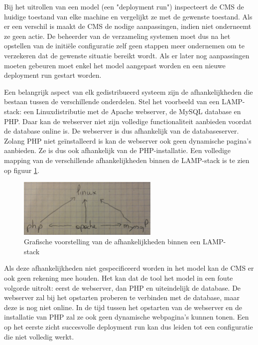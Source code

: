 Bij het uitrollen van een model (een "deployment run") inspecteert de CMS de huidige toestand van elke machine en vergelijkt ze met de gewenste toestand.
Als er een verschil is maakt de CMS de nodige aanpassingen, indien niet onderneemt ze geen actie.
De beheerder van de verzameling systemen moet dus na het opstellen van de initi\"ele configuratie zelf geen stappen meer ondernemen om te verzekeren dat de gewenste situatie bereikt wordt.
Als er later nog aanpassingen moeten gebeuren moet enkel het model aangepast worden en een nieuwe deployment run gestart worden.

Een belangrijk aspect van elk gedistribueerd systeem zijn de afhankelijkheden die bestaan tussen de verschillende onderdelen.
Stel het voorbeeld van een LAMP-stack: een Linuxdistributie met de Apache webserver, de MySQL database en PHP.
Daar kan de webserver niet zijn volledige functionaliteit aanbieden voordat de database online is.
De webserver is dus afhankelijk van de databaseserver.
Zolang PHP niet ge\"installeerd is kan de webserver ook geen dynamische pagina's aanbieden.
Ze is dus ook afhankelijk van de PHP-installatie.
Een volledige mapping van de verschillende afhankelijkheden binnen de LAMP-stack is te zien op figuur \ref{fig:lamp_dep}.
\begin{figure}
    \begin{center}
    \includegraphics[width=0.6\textwidth]{images/lamp_dep.png}
    \caption{Grafische voorstelling van de afhankelijkheden binnen een LAMP-stack}
    \label{fig:lamp_dep}
    \end{center}
\end{figure}

Als deze afhankelijkheden niet gespecificeerd worden in het model kan de CMS er ook geen rekening mee houden.
Het kan dat de tool het model in een foute volgorde uitrolt: eerst de webserver, dan PHP en uiteindelijk de database.
De webserver zal bij het opstarten proberen te verbinden met de database, maar deze is nog niet online.
In de tijd tussen het opstarten van de webserver en de installatie van PHP zal ze ook geen dynamische webpagina's kunnen tonen.
Een op het eerste zicht succesvolle deployment run kan dus leiden tot een configuratie die niet volledig werkt.

